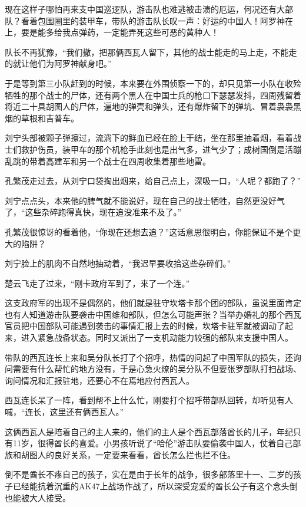 现在这样子哪怕再来支中国巡逻队，游击队也难逃被击溃的厄运，何况还有大部队？看着包围圈里的装甲车，带队的游击队长叹一声：好运的中国人！阿罗神在上，要是能多给我点弹药，一定能弄死这些可恶的黄种人！

队长不再犹豫，“我们撤，把那俩西瓦人留下，其他的战士能走的马上走，不能走的就让他们为阿罗神献身吧。”

于是等到第三小队赶到的时候，本来要在外围侦察一下的，却只见第一小队在收殓牺牲的那个战士的尸体，还有两个黑人在中国士兵的枪口下瑟瑟发抖，四周残留着将近二十具胡图人的尸体，遍地的弹壳和弹头，还有爆炸留下的弹坑、冒着袅袅黑烟的草根和吉普车。

刘宁头部被颗子弹擦过，流淌下的鲜血已经在脸上干结，坐在那里抽着烟，看着战士们救护伤员，装甲车的那个机枪手此刻也是出气多，进气少了；成树国倒是活蹦乱跳的带着高建军和另一个战士在四周收集着那些地雷。

孔繁茂走过去，从刘宁口袋掏出烟来，给自己点上，深吸一口，“人呢？都跑了？”

刘宁点点头，本来他的脾气就不能说好，现在自己的战士牺牲，自然更没好气了，“这些杂碎跑得真快，现在追没准来不及了。”

孔繁茂很惊讶的看着他，“你现在还想去追？”这话意思很明白，你能保证不是个更大的陷阱？

刘宁脸上的肌肉不自然地抽动着，“我迟早要收拾这些杂碎们。”

楚云飞走了过来，“刚卡政府军到了，来了一个连。”

这支政府军的出现不是偶然的，他们就是驻守坎塔卡那个团的部队，虽说里面肯定也有人知道游击队要袭击中国维和部队，但怎么可能声张？当举办婚礼的那个西瓦官员把中国部队可能遇到袭击的事情汇报上去的时候，坎塔卡驻军就被调动了起来，进入紧急战备状态。同时又派出了一支机动能力较强的部队来支援中国人。

带队的西瓦连长上来和吴分队长打了个招呼，热情的问起了中国军队的损失，还询问需要有什么帮忙的地方没有，于是心急火燎的吴分队不但要张罗部队打扫战场、询问情况和汇报驻地，还要心不在焉地应付西瓦人。

西瓦连长呆了一阵，看到帮不上什么忙，刚要打个招呼带部队回转，却听见有人喊，“连长，这里还有俩西瓦人。”

这俩西瓦人是陪着自己的主人来的，他们的主人是个西瓦部落酋长的儿子，年纪只有11岁，很得酋长的喜爱。小男孩听说了“哈伦”游击队要偷袭中国人，仗着自己部族和胡图人的良好关系，一定要来看看，酋长怎么拦也拦不住。

倒不是酋长不疼自己的孩子，实在是由于长年的战争，很多部落里十一、二岁的孩子已经能抗着沉重的AK47上战场作战了，所以深受宠爱的酋长公子有这个念头倒也能被大人接受。

